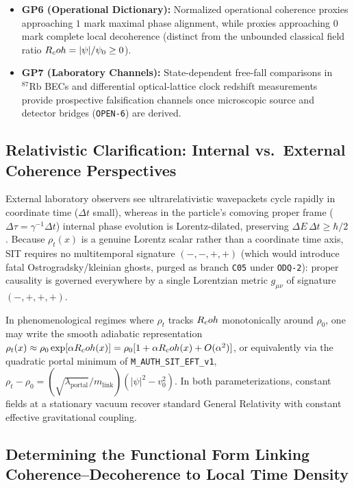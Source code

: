 \begin{itemize}
  \item \textbf{GP6 (Operational Dictionary):} Normalized operational coherence proxies approaching $1$ mark maximal phase alignment, while proxies approaching $0$ mark complete local decoherence (distinct from the unbounded classical field ratio $R_coh = |\psi|/\psi_0 \ge 0$).
  \item \textbf{GP7 (Laboratory Channels):} State-dependent free-fall comparisons in $^{87}\mathrm{Rb}$ BECs and differential optical-lattice clock redshift measurements provide prospective falsification channels once microscopic source and detector bridges (\texttt{OPEN-6}) are derived.
\end{itemize}

\subsection{Relativistic Clarification: Internal vs.\ External Coherence Perspectives}

External laboratory observers see ultrarelativistic wavepackets cycle rapidly in coordinate time ($\Delta t$ small), whereas in the particle's comoving proper frame ($\Delta\tau = \gamma^{-1}\Delta t$) internal phase evolution is Lorentz-dilated, preserving $\Delta E\,\Delta t \ge \hbar/2$. Because $\rho_t(x)$ is a genuine Lorentz scalar rather than a coordinate time axis, SIT requires no multitemporal signature $(-, -, +, +)$ (which would introduce fatal Ostrogradsky/kleinian ghosts, purged as branch \texttt{C05} under \texttt{ODQ-2}): proper causality is governed everywhere by a single Lorentzian metric $g_{\mu\nu}$ of signature $(-,+,+,+)$.

In phenomenological regimes where $\rho_t$ tracks $R_coh$ monotonically around $\rho_0$, one may write the smooth adiabatic representation $\rho_t(x) \approx \rho_0\exp[\alpha R_coh(x)] = \rho_0[1 + \alpha R_coh(x) + O(\alpha^2)]$, or equivalently via the quadratic portal minimum of \texttt{M\_AUTH\_SIT\_EFT\_v1}, $\rho_t - \rho_0 = (\sqrt{\lambda_{\mathrm{portal}}}/m_{\mathrm{link}})(|\psi|^2 - v_0^2)$. In both parameterizations, constant fields at a stationary vacuum recover standard General Relativity with constant effective gravitational coupling.

\subsection{Determining the Functional Form Linking Coherence--Decoherence to Local Time Density}

